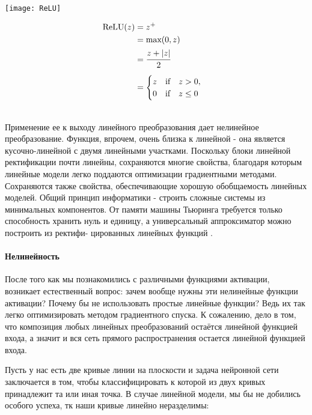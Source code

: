 \begin{minipage}{0.45\textwidth}
    \texttt{[image: ReLU]}
    \label{fig:ReLU}
\end{minipage}
\hspace{30pt}
\begin{minipage}{0.2\textwidth}
    \begin{align*}
        \text{ReLU}(z) &= z^{+} \\
        &= \text{max}(0, z) \\
        &= \cfrac{z + |z|}{2} \\[0.5em]
        &= \begin{cases}
            z \quad \text{if} \quad z > 0, \\
            0 \quad \text{if} \quad z \leq 0
        \end{cases}
    \end{align*}
\end{minipage}\\

Применение ее к выходу линейного преобразования дает нелинейное преобразование. 
Функция, впрочем, очень близка
к линейной - она является кусочно-линейной с двумя линейными участками. 
Поскольку блоки линейной ректификации почти линейны, сохраняются
многие свойства, благодаря которым линейные модели легко поддаются
оптимизации градиентными методами. Сохраняются также свойства, обес­печивающие 
хорошую обобщаемость линейных моделей. Общий принцип
информатики - строить сложные системы из минимальных компонентов.
От памяти машины Тьюринга требуется только способность хранить нуль
и единицу, а универсальный аппроксиматор можно построить из ректифи-
цированных линейных функций \cite{Goodfellow-et-al-2016}.

\paragraph{Нелинейность}

После того как мы познакомились с различными функциями активации, 
возникает естественный вопрос: зачем вообще нужны эти нелинейные функции активации? 
Почему бы не использовать простые линейные функции? 
Ведь их так легко оптимизировать методом градиентного спуска. 
К сожалению, дело в том, что композиция любых линейных преобразований остаётся линейной 
функцией входа, а значит и вся сеть прямого распространения остается линейной 
функцией входа.

Пусть у нас есть две кривые линии на плоскости и задача нейронной сети заключается в том, 
чтобы классифицировать к которой из двух кривых принадлежит та или иная точка. В случае 
линейной модели, мы бы не добились особого успеха, тк наши кривые линейно неразделимы:\\

